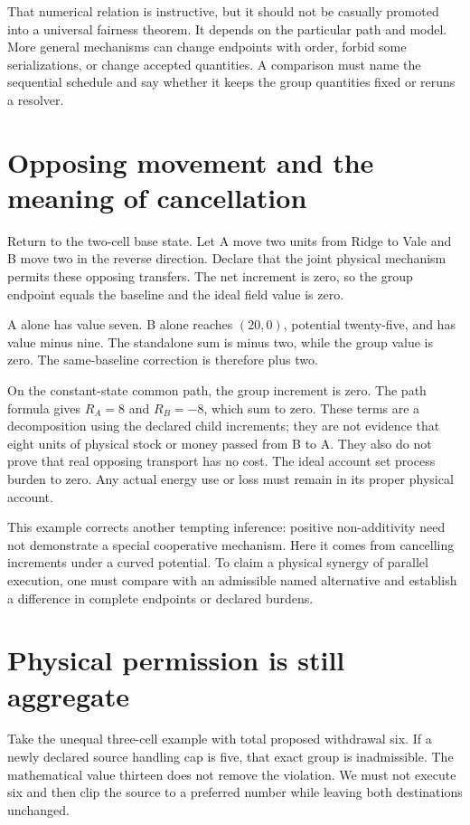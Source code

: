 That numerical relation is instructive, but it should not be casually promoted into a universal fairness theorem. It depends on the particular path and model. More general mechanisms can change endpoints with order, forbid some serializations, or change accepted quantities. A comparison must name the sequential schedule and say whether it keeps the group quantities fixed or reruns a resolver.

\section{Opposing movement and the meaning of cancellation}

Return to the two-cell base state. Let A move two units from Ridge to Vale and B move two in the reverse direction. Declare that the joint physical mechanism permits these opposing transfers. The net increment is zero, so the group endpoint equals the baseline and the ideal field value is zero.

A alone has value seven. B alone reaches \((20,0)\), potential twenty-five, and has value minus nine. The standalone sum is minus two, while the group value is zero. The same-baseline correction is therefore plus two.

On the constant-state common path, the group increment is zero. The path formula gives \(R_A=8\) and \(R_B=-8\), which sum to zero. These terms are a decomposition using the declared child increments; they are not evidence that eight units of physical stock or money passed from B to A. They also do not prove that real opposing transport has no cost. The ideal account set process burden to zero. Any actual energy use or loss must remain in its proper physical account.

This example corrects another tempting inference: positive non-additivity need not demonstrate a special cooperative mechanism. Here it comes from cancelling increments under a curved potential. To claim a physical synergy of parallel execution, one must compare with an admissible named alternative and establish a difference in complete endpoints or declared burdens.

\section{Physical permission is still aggregate}

Take the unequal three-cell example with total proposed withdrawal six. If a newly declared source handling cap is five, that exact group is inadmissible. The mathematical value thirteen does not remove the violation. We must not execute six and then clip the source to a preferred number while leaving both destinations unchanged.

